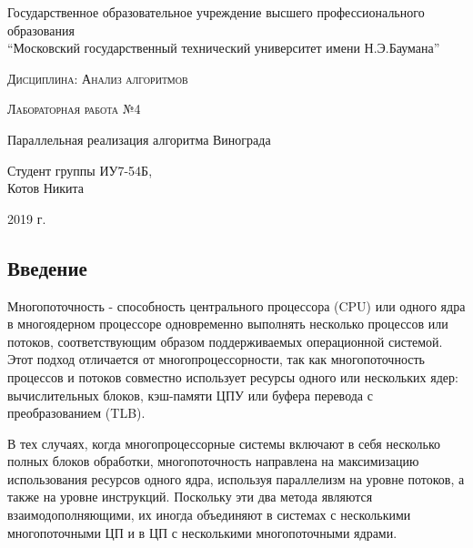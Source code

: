 \documentclass[a4paper,12pt]{article}
\begin{document}
    \begin{titlepage}
        \begin{center}
            \large
            Государственное образовательное учреждение высшего профессионального образования\\
            “Московский государственный технический университет имени Н.Э.Баумана”
            \vspace{3cm}
            
            \textsc{Дисциплина: Анализ алгоритмов}
            \vspace{0.5cm}
                
            \textsc{Лабораторная работа №4}
            \vspace{3cm}
            
            {\LARGE Параллельная реализация алгоритма Винограда}
            \vspace{3cm}
            
            Студент группы ИУ7-54Б,\\   
            Котов Никита
            \vfill
            
            2019 г.            
            \end{center}
    \end{titlepage}
    
    \begin{center}
    	\tableofcontents
    \end{center}
	
	\setcounter{page}{2}
	\newpage
    \begin{center}
        \section*{Введение}
    \end{center}
        \label{sec:intro}
\quad Многопоточность - способность центрального процессора (CPU) или одного ядра в многоядерном процессоре одновременно выполнять несколько процессов или потоков, соответствующим образом поддерживаемых операционной системой. Этот подход отличается от многопроцессорности, так как многопоточность процессов и потоков совместно использует ресурсы одного или нескольких ядер: вычислительных блоков, кэш-памяти ЦПУ или буфера перевода с преобразованием (TLB).


В тех случаях, когда многопроцессорные системы включают в себя несколько полных блоков обработки, многопоточность направлена на максимизацию использования ресурсов одного ядра, используя параллелизм на уровне потоков, а также на уровне инструкций. Поскольку эти два метода являются взаимодополняющими, их иногда объединяют в системах с несколькими многопоточными ЦП и в ЦП с несколькими многопоточными ядрами.
 
\end{document}
